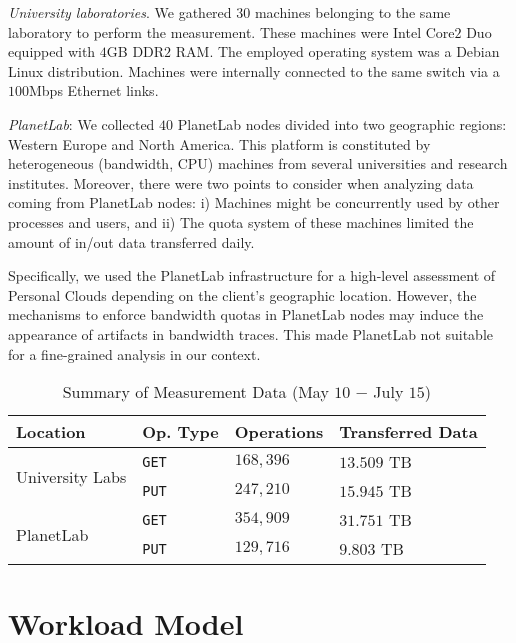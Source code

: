\textit{University laboratories}. We gathered $30$ machines
belonging to the same laboratory to perform the measurement.
These machines were Intel Core$2$ Duo equipped with $4$GB DDR$2$ RAM. 
The employed operating system was a Debian Linux distribution. 
Machines were internally connected to the same switch via a $100$Mbps Ethernet links.

\textit{PlanetLab}: We collected $40$ PlanetLab nodes divided into
two geographic regions: Western Europe and North America. 
This platform is constituted by heterogeneous (bandwidth, CPU) machines from several
universities and research institutes. Moreover, there were two points to consider
when analyzing data coming from PlanetLab nodes: i) Machines might be concurrently
used by other processes and users, and ii) The quota system of these machines
limited the amount of in/out data transferred daily. 

Specifically, we used the PlanetLab infrastructure for
a high-level assessment of Personal Clouds depending on the 
client's geographic location. 
However, the mechanisms to enforce bandwidth quotas
in PlanetLab nodes may induce the appearance of artifacts 
in bandwidth traces. This made PlanetLab not 
suitable for a fine-grained analysis in our context.
   
\begin{table}%
\begin{center}

\begin{tabular}{|l|l|l|l|}
\hline
Location & Op. Type & Operations & Transferred Data \\ \hline
\multirow{2}{*}{University Labs}
 & \texttt{GET} & $168,396$ & $13.509$ TB\\
 & \texttt{PUT} & $247,210$ & $15.945$ TB\\ \hline
\multirow{2}{*}{PlanetLab}
 & \texttt{GET} & $354,909$ & $31.751$ TB\\
 & \texttt{PUT} & $129,716$ & $9.803$ TB\\ \hline
\end{tabular}
\caption{Summary of Measurement Data (May $10$ $-$ July $15$)}
\vspace{-9mm}
\label{tab:measurement_data}
\end{center}
\end{table}

\section{Workload Model} 

